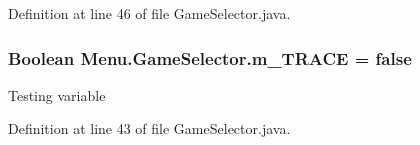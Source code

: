 Definition at line 46 of file Game\+Selector.\+java.

\hypertarget{class_menu_1_1_game_selector_a2eb9bf5de7be21be696db9228f4bff0f}{}
\subsubsection[{m\+\_\+\+T\+R\+A\+C\+E}]{\setlength{\rightskip}{0pt plus 5cm}Boolean Menu.\+Game\+Selector.\+m\+\_\+\+T\+R\+A\+C\+E = false\hspace{0.3cm}{\ttfamily [static]}}\label{class_menu_1_1_game_selector_a2eb9bf5de7be21be696db9228f4bff0f}
Testing variable 

Definition at line 43 of file Game\+Selector.\+java.



